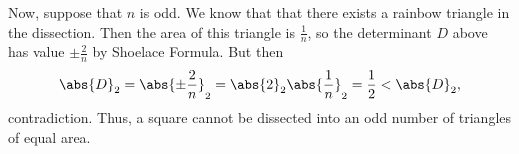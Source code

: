 Now, suppose that $n$ is odd. We know that that there exists a rainbow triangle in the dissection. Then the area of this triangle is $\frac{1}{n}$, so the determinant $D$ above has value $\pm\frac{2}{n}$ by Shoelace Formula. But then \[\abs{D}_2=\abs{\pm\frac{2}{n}}_2=\abs{2}_2\abs{\frac{1}{n}}_2=\frac{1}{2}<\abs{D}_2,\] contradiction. Thus, a square cannot be dissected into an odd number of triangles of equal area.